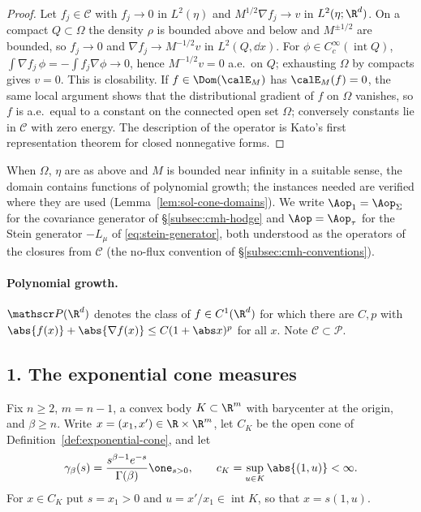 \documentclass[../main.tex]{subfiles}
\begin{document}
\begin{proof}
Let $f_j\in\mathscr C$ with $f_j\to0$ in $L^2(\eta)$ and $M^{1/2}\nabla f_j\to v$ in
$L^2(\eta;\R^d)$.  On a compact $Q\subset\Omega$ the density $\rho$ is bounded above and below
and $M^{\pm1/2}$ are bounded, so $f_j\to0$ and $\nabla f_j\to M^{-1/2}v$ in $L^2(Q,\dd x)$.
For $\phi\in C_c^\infty(\operatorname{int}Q)$,
$\int\nabla f_j\,\phi=-\int f_j\nabla\phi\to0$, hence $M^{-1/2}v=0$ a.e.\ on $Q$; exhausting
$\Omega$ by compacts gives $v=0$.  This is closability.  If $f\in\Dom(\calE_M)$ has
$\calE_M(f)=0$, the same local argument shows that the distributional gradient of $f$ on
$\Omega$ vanishes, so $f$ is a.e.\ equal to a constant on the connected open set $\Omega$;
conversely constants lie in $\mathscr C$ with zero energy.  The description of the operator is
Kato's first representation theorem for closed nonnegative forms.
\end{proof}

When $\Omega$, $\eta$ are as above and $M$ is bounded near infinity in a suitable sense, the
domain contains functions of polynomial growth; the instances needed are verified where they
are used (Lemma~\ref{lem:sol-cone-domains}).  We write $\Aop_1=\Aop_\Sigma$ for the covariance
generator of \S\ref{subsec:cmh-hodge} and $\Aop=\Aop_\tau$ for the Stein generator
$-L_\mu$ of \eqref{eq:stein-generator}, both understood as the operators of the closures from
$\mathscr C$ (the no-flux convention of \S\ref{subsec:cmh-conventions}).

\paragraph{Polynomial growth.}
$\mathscr P(\R^d)$ denotes the class of $f\in C^1(\R^d)$ for which there are $C,p$ with
$\abs{f(x)}+\abs{\nabla f(x)}\le C(1+\abs x)^p$ for all $x$.  Note $\mathscr C\subset\mathscr P$.

\subsection*{1. The exponential cone measures}
\label{subsec:sol-cone-measure}

Fix $n\ge2$, $m=n-1$, a convex body $K\subset\R^m$ with barycenter at the origin, and
$\beta\ge n$.  Write $x=(x_1,x')\in\R\times\R^m$, let $C_K$ be the open cone of
Definition~\ref{def:exponential-cone}, and let
\[
  \gamma_\beta(s)=\frac{s^{\beta-1}e^{-s}}{\Gamma(\beta)}\one_{s>0},
  \qquad
  c_K=\sup_{u\in K}\abs{(1,u)}<\infty .
\]
For $x\in C_K$ put $s=x_1>0$ and $u=x'/x_1\in\operatorname{int}K$, so that $x=s(1,u)$.
\end{document}
